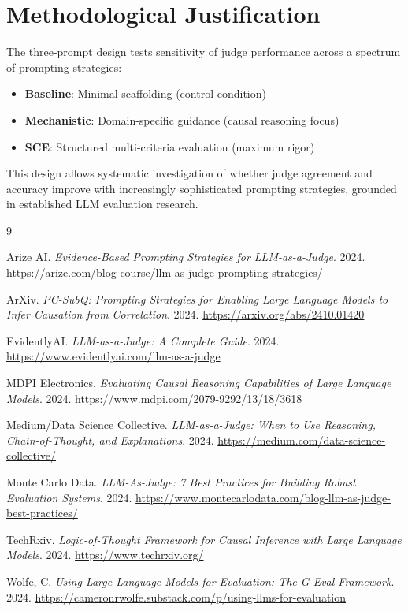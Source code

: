 \documentclass[11pt]{article}
\begin{document}
\section{Methodological Justification}

The three-prompt design tests sensitivity of judge performance across a spectrum of prompting strategies:

\begin{itemize}
    \item \textbf{Baseline}: Minimal scaffolding (control condition)
    \item \textbf{Mechanistic}: Domain-specific guidance (causal reasoning focus)
    \item \textbf{SCE}: Structured multi-criteria evaluation (maximum rigor)
\end{itemize}

This design allows systematic investigation of whether judge agreement and accuracy improve with increasingly sophisticated prompting strategies, grounded in established LLM evaluation research.

\begin{thebibliography}{9}

Arize AI.
\textit{Evidence-Based Prompting Strategies for LLM-as-a-Judge}.
2024.
\url{https://arize.com/blog-course/llm-as-judge-prompting-strategies/}

ArXiv.
\textit{PC-SubQ: Prompting Strategies for Enabling Large Language Models to Infer Causation from Correlation}.
2024.
\url{https://arxiv.org/abs/2410.01420}

EvidentlyAI.
\textit{LLM-as-a-Judge: A Complete Guide}.
2024.
\url{https://www.evidentlyai.com/llm-as-a-judge}

MDPI Electronics.
\textit{Evaluating Causal Reasoning Capabilities of Large Language Models}.
2024.
\url{https://www.mdpi.com/2079-9292/13/18/3618}

Medium/Data Science Collective.
\textit{LLM-as-a-Judge: When to Use Reasoning, Chain-of-Thought, and Explanations}.
2024.
\url{https://medium.com/data-science-collective/}

Monte Carlo Data.
\textit{LLM-As-Judge: 7 Best Practices for Building Robust Evaluation Systems}.
2024.
\url{https://www.montecarlodata.com/blog-llm-as-judge-best-practices/}

TechRxiv.
\textit{Logic-of-Thought Framework for Causal Inference with Large Language Models}.
2024.
\url{https://www.techrxiv.org/}

Wolfe, C.
\textit{Using Large Language Models for Evaluation: The G-Eval Framework}.
2024.
\url{https://cameronrwolfe.substack.com/p/using-llms-for-evaluation}

\end{thebibliography}
\end{document}
